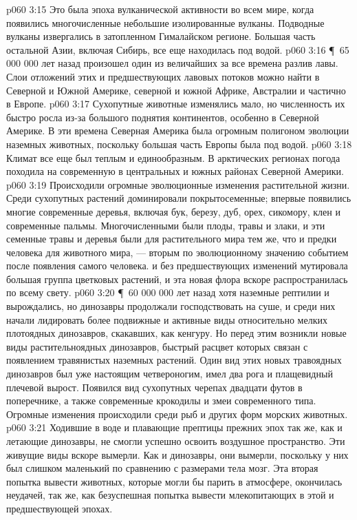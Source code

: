 \vs p060 3:15 Это была эпоха вулканической активности во всем мире, когда появились многочисленные небольшие изолированные вулканы. Подводные вулканы извергались в затопленном Гималайском регионе. Большая часть остальной Азии, включая Сибирь, все еще находилась под водой.
\vs p060 3:16 \P\ 65 000 000 лет назад произошел один из величайших за все времена разлив лавы. Слои отложений этих и предшествующих лавовых потоков можно найти в Северной и Южной Америке, северной и южной Африке, Австралии и частично в Европе.
\vs p060 3:17 Сухопутные животные изменялись мало, но численность их быстро росла из\hyp{}за большого поднятия континентов, особенно в Северной Америке. В эти времена Северная Америка была огромным полигоном эволюции наземных животных, поскольку большая часть Европы была под водой.
\vs p060 3:18 Климат все еще был теплым и единообразным. В арктических регионах погода походила на современную в центральных и южных районах Северной Америки.
\vs p060 3:19 Происходили огромные эволюционные изменения растительной жизни. Среди сухопутных растений доминировали покрытосеменные; впервые появились многие современные деревья, включая бук, березу, дуб, орех, сикомору, клен и современные пальмы. Многочисленными были плоды, травы и злаки, и эти семенные травы и деревья были для растительного мира тем же, что и предки человека для животного мира, --- вторым по эволюционному значению событием после появления самого человека.  и без предшествующих изменений мутировала большая группа цветковых растений, и эта новая флора вскоре распространилась по всему свету.
\vs p060 3:20 \P\ 60 000 000 лет назад хотя наземные рептилии и вырождались, но динозавры продолжали господствовать на суше, и среди них начали лидировать более подвижные и активные виды относительно мелких плотоядных динозавров, скакавших, как кенгуру. Но перед этим возникли новые виды растительноядных динозавров, быстрый расцвет которых связан с появлением травянистых наземных растений. Один вид этих новых травоядных динозавров был уже настоящим четвероногим, имел два рога и плащевидный плечевой вырост. Появился вид сухопутных черепах двадцати футов в поперечнике, а также современные крокодилы и змеи современного типа. Огромные изменения происходили среди рыб и других форм морских животных.
\vs p060 3:21 Ходившие в воде и плавающие прептицы прежних эпох так же, как и летающие динозавры, не смогли успешно освоить воздушное пространство. Эти живущие виды вскоре вымерли. Как и динозавры, они вымерли, поскольку у них был слишком маленький по сравнению с размерами тела мозг. Эта вторая попытка вывести животных, которые могли бы парить в атмосфере, окончилась неудачей, так же, как безуспешная попытка вывести млекопитающих в этой и предшествующей эпохах.
